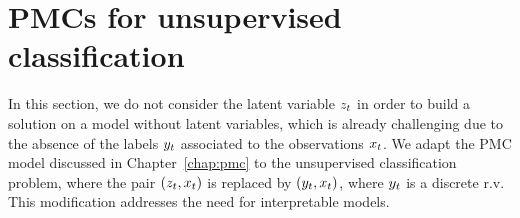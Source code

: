 
\newpage
\section{PMCs for unsupervised classification}
\label{sec:generalParam}



In this section, we do not consider the latent variable $z_t$ in order to
build a solution on a model without latent variables, which is already
challenging due to the absence of the labels $y_t$ associated to 
the observations $x_t$.
We adapt the PMC model 
discussed in Chapter~\ref{chap:pmc} 
to the unsupervised classification problem, where
the pair $(z_t,x_t)$ is replaced by $(y_t,x_t)$, 
where $y_t$ is a discrete r.v.
This modification addresses the need for interpretable models. 


